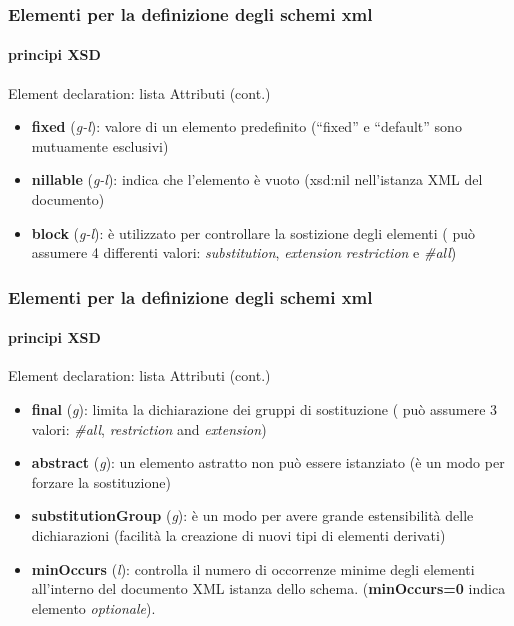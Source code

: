 \begin{frame}
	\frametitle{Elementi per la definizione degli schemi xml}
	\framesubtitle{principi XSD}
	\addtocounter{nframe}{1}

	\begin{block}{Element declaration: lista Attributi (cont.)}
		\begin{itemize}
			\item \textbf{fixed} (\textit{g-l}): valore di un elemento predefinito (``fixed'' e ``default'' sono mutuamente esclusivi)
			\item \textbf{nillable} (\textit{g-l}): indica che l'elemento è vuoto (xsd:nil nell'istanza XML del documento)
			\item \textbf{block} (\textit{g-l}): è utilizzato per controllare la sostizione degli elementi ( può assumere 4 differenti valori: \textit{substitution}, \textit{extension} \textit{restriction} e \textit{\#all})
		\end{itemize}
	\end{block}

\end{frame}

\begin{frame}
	\frametitle{Elementi per la definizione degli schemi xml}
	\framesubtitle{principi XSD}
	\addtocounter{nframe}{1}

	\begin{block}{Element declaration: lista Attributi (cont.)}

		\begin{itemize}
			\item \textbf{final} (\textit{g}): limita la dichiarazione dei gruppi di sostituzione ( può assumere 3 valori: \textit{\#all}, \textit{restriction} and \textit{extension})
			\item \textbf{abstract} (\textit{g}): un elemento astratto non può essere istanziato (è un modo per forzare la sostituzione)
			\item \textbf{substitutionGroup} (\textit{g}): è un modo per avere grande estensibilità delle dichiarazioni (facilità la creazione di nuovi tipi di elementi derivati)
			\item \textbf{minOccurs} (\textit{l}): controlla il numero di occorrenze minime degli elementi all'interno del documento XML istanza dello schema. (\textbf{minOccurs=0} indica elemento \textit{optionale}).
		\end{itemize}
	\end{block}

\end{frame}

